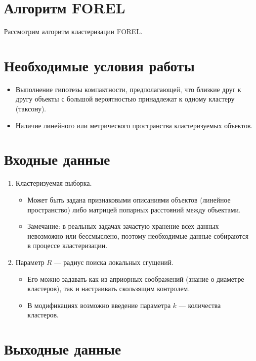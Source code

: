 \section{Алгоритм FOREL}
Рассмотрим алгоритм кластеризации FOREL.
\section*{Необходимые условия работы}

\begin{itemize}
    \item Выполнение гипотезы компактности, предполагающей, что близкие друг к другу объекты с большой вероятностью принадлежат к одному кластеру (таксону).
    \item Наличие линейного или метрического пространства кластеризуемых объектов.
\end{itemize}

\section*{Входные данные}

\begin{enumerate}
    \item Кластеризуемая выборка.
    \begin{itemize}
        \item Может быть задана признаковыми описаниями объектов (линейное пространство) либо матрицей попарных расстояний между объектами.
        \item Замечание: в реальных задачах зачастую хранение всех данных невозможно или бессмыслено, поэтому необходимые данные собираются в процессе кластеризации.
    \end{itemize}
    \item Параметр \( R \) — радиус поиска локальных сгущений.
    \begin{itemize}
        \item Его можно задавать как из априорных соображений (знание о диаметре кластеров), так и настраивать скользящим контролем.
        \item В модификациях возможно введение параметра \( k \) — количества кластеров.
    \end{itemize}
\end{enumerate}

\section*{Выходные данные}

